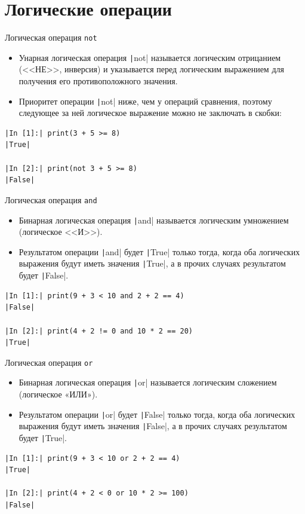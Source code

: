\documentclass[aspectratio=169]{beamer}	%
\begin{document}
\section{Логические операции}
\sectionframe


\begin{frame}[fragile]{Логическая операция \texttt{not}}
\scriptsize
\begin{itemize}
	\item Унарная логическая операция \texttt|not| называется логическим отрицанием (<<НЕ>>, инверсия) и указывается перед логическим выражением для получения его противоположного значения.
	
	\item Приоритет операции \texttt|not| ниже, чем у операций сравнения, поэтому следующее за ней логическое выражение можно не заключать в скобки:
\end{itemize}
\begin{verbatim}
|In [1]:| print(3 + 5 >= 8)
|True|

|In [2]:| print(not 3 + 5 >= 8)
|False|
\end{verbatim}
\vfill
\end{frame}


\begin{frame}[fragile]{Логическая операция \texttt{and}}
\scriptsize
\begin{itemize}
	\item Бинарная логическая операция \texttt|and| называется логическим умножением (логическое <<И>>).
		
	\item Результатом  операции \texttt|and| будет \texttt|True| только тогда, когда оба логических выражения будут иметь значения \texttt|True|, а в прочих случаях результатом будет \texttt|False|.
\end{itemize}
\begin{verbatim}
|In [1]:| print(9 + 3 < 10 and 2 + 2 == 4)
|False|

|In [2]:| print(4 + 2 != 0 and 10 * 2 == 20)
|True|
\end{verbatim}
\vfill
\end{frame}


\begin{frame}[fragile]{Логическая операция \texttt{or}}
\scriptsize
\begin{itemize}
	\item Бинарная логическая операция \texttt|or| называется логическим сложением (логическое «ИЛИ»).
		
	\item Результатом  операции \texttt|or| будет \texttt|False| только тогда, когда оба логических выражения будут иметь значения \texttt|False|, а в прочих случаях результатом будет \texttt|True|.
\end{itemize}
\begin{verbatim}
|In [1]:| print(9 + 3 < 10 or 2 + 2 == 4)
|True|

|In [2]:| print(4 + 2 < 0 or 10 * 2 >= 100)
|False|
\end{verbatim}
\vfill	
\end{frame}
\end{document}
